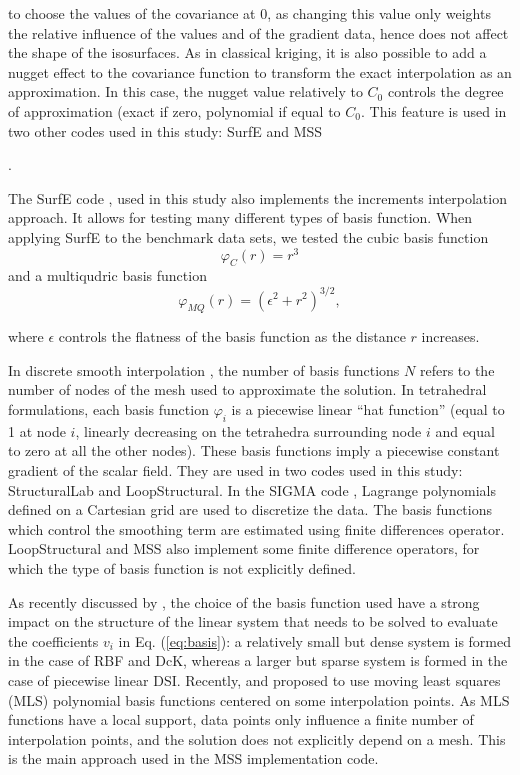 \documentclass[final]{ring20}
\begin{document}
to choose the values of the covariance at 0, as changing this value only weights the relative influence of the values and of the gradient data, hence does not affect the shape of the isosurfaces. As in classical kriging, it is also possible to add a nugget effect to the covariance function to transform the exact interpolation as an approximation. In this case, the nugget value relatively to $C_0$ controls the degree of approximation (exact if zero, polynomial if equal to $C_0$. This feature is used in two other codes used in this study: SurfE \citep{Hillier2014MG} and MSS {\citep{Renaudeau2019MG}. 

The SurfE code \citep{Hillier2014MG}, used in this study also implements the increments interpolation approach. It allows for testing many different types of basis function. When applying SurfE to the benchmark data sets, we tested the cubic basis function 
\begin{equation}
\varphi_{C}(r) = r^3
\end{equation}
and a multiqudric basis function
\begin{equation}
\varphi_{MQ}(r) = (\epsilon^2 + r^2)^{3/2},
\end{equation}

where $\epsilon$ controls the flatness of the basis function as the distance $r$ increases. 

In discrete smooth interpolation \citep[DSI, ][]{Frank2007CG,Caumon2013GaRSITo,Souche20137ECEISE2,Laurent2016MG,Irakarama2018EAGE}, the number of basis functions $N$ refers to the number of nodes of the mesh used to approximate the solution. In tetrahedral formulations, each basis function $\varphi_i$ is a piecewise linear ``hat function'' (equal to 1 at node $i$, linearly decreasing on the tetrahedra surrounding node $i$ and equal to zero at all the other nodes). These basis functions imply a piecewise constant gradient of the scalar field. They are used in two codes used in this study: StructuralLab \citep{Frank2007CG,Caumon2013GaRSITo} and LoopStructural. 
In the SIGMA code \cite{Irakarama2018EAGE}, Lagrange polynomials defined on a Cartesian grid are used to discretize the data. The basis functions which control the smoothing term are estimated using finite differences operator. LoopStructural and MSS also implement some finite difference operators, for which the type of basis function is not explicitly defined. 

As recently discussed by \citet{Renaudeau2019MG}, the choice of the basis function used have a strong impact on the structure of the linear system that needs to be solved to evaluate the coefficients $v_i$ in Eq. (\ref{eq:basis}): a relatively small but dense system is formed in the case of RBF and DcK, whereas a larger but sparse system is formed in the case of piecewise linear DSI. Recently, \citet{Renaudeau2019MG} and \citet{Manchuk2019CG} proposed to use moving least squares (MLS) polynomial basis functions centered on some interpolation points. As MLS functions have a local support, data points only influence a finite number of interpolation points, and the solution does not explicitly depend on a mesh. This is the main approach used in the MSS implementation code. 

}
\end{document}
